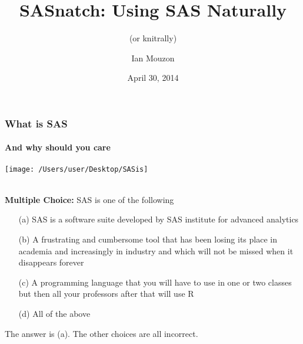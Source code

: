 \documentclass[xcolor=dvipsnames,gray,mathserif]{beamer}
\title[SASnatch]{SASnatch: Using SAS Naturally}
\subtitle{(or knitrally)}
\subtitle{\smaller{(or snatchurally)}}
\author[Mouzon]{Ian Mouzon}
\institute[Stats@ISU]{Department of Statistics\\Iowa State University }
\date[Apr 30, 2014]{April 30, 2014}
\begin{document}
%



\begin{frame}
\titlepage
\end{frame}

\begin{frame}
\frametitle{What is SAS}
\framesubtitle{And why should you care}
\centerline{\texttt{[image: /Users/user/Desktop/SASis]}} \\

\textbf{Multiple Choice:}
SAS is one of the following
\begin{itemize}
   \item[(a)] 
      SAS is a software suite developed by SAS institute for advanced analytics
   \item[(b)] 
      A frustrating and cumbersome tool that has been losing 
      its place in academia and increasingly in industry and which will not be
      missed when it disappears forever
   \item[(c)]
      A programming language that you will have to use in one or two classes
      but then all your professors after that will use R
   \item[(d)]
      All of the above
\end{itemize}
\pause The answer is (a). The other choices are all incorrect.
\end{frame}
\end{document}
